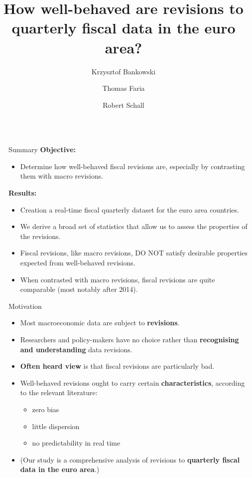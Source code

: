 \documentclass[final]{beamer}
\title{How well-behaved are revisions to quarterly fiscal data in the euro area?}
\author{Krzysztof Bankowski \inst{1} \and Thomas Faria \inst{2} \and Robert Schall \inst{3}}
\institute[shortinst]{\inst{1} European Central Bank \samelineand \inst{2} Insee \samelineand \inst{3} European University Institute}
\newlength{\sepwidth}
\newlength{\colwidth}
\newcommand{\separatorcolumn}{\begin{column}{\sepwidth}\end{column}}
\begin{document}
\begin{frame}[t]
\begin{columns}[t]
\separatorcolumn

\begin{column}{\colwidth}

  \begin{alertblock}{Summary}
    \textbf{Objective:}
    \begin{itemize}
      \item Determine how well-behaved fiscal revisions are, especially by contrasting them with macro revisions.
    \end{itemize}

    \textbf{Results:}
    \begin{itemize}
      \item Creation a real-time fiscal quarterly dataset for the euro area countries.
      \item We derive a broad set of statistics that allow us to assess the properties of the revisions.
      \item Fiscal revisions, like macro revisions, DO NOT satisfy desirable properties expected from well-behaved revisions.
      \item When contrasted with macro revisions, fiscal revisions are quite comparable (most notably after 2014).
    \end{itemize}

  \end{alertblock}

  \begin{block}{Motivation}

    \begin{itemize}
      \item Most macroeconomic data are subject to \textbf{revisions}.
      \item Researchers and policy-makers have no choice rather than \textbf{recognising and understanding} data revisions.
      \item \textbf{Often heard view} is that fiscal revisions are particularly bad.
      \item Well-behaved revisions ought to carry certain \textbf{characteristics}, according to the relevant literature:
      \begin{itemize}
        \item zero bias
        \item little dispersion 
        \item no predictability in real time
      \end{itemize}
      \item (Our study is a comprehensive analysis of revisions to \textbf{quarterly fiscal data in the euro area}.)
    \end{itemize}
  \end{block}


\end{column}
\end{columns}
\end{frame}
\end{document}
